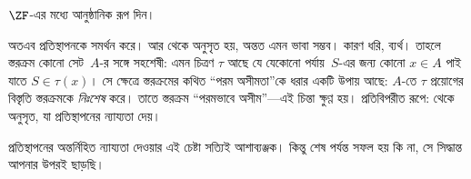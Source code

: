 \documentclass[../../../include/open-logic-section]{subfiles}
\begin{document}
\begin{prob}
	$\ZF$-এর মধ্যে \stagescofin{}
	আনুষ্ঠানিক রূপ দিন।
\end{prob}

অতএব \stagescofin{} প্রতিস্থাপনকে
সমর্থন করে। আর \stagesinex{} থেকে
\stagescofin{} অনুসৃত হয়, অন্তত
এমন ভাবা সম্ভব। কারণ ধরি,
\stagescofin{} ব্যর্থ। তাহলে স্তরক্রম
কোনো সেট~$A$-র সঙ্গে সহশেষী: এমন
চিত্রণ $\tau$ আছে যে যেকোনো
পর্যায়~$S$-এর জন্য কোনো $x \in A$
পাই যাতে $S \in \tau(x)$। সে ক্ষেত্রে
স্তরক্রমের কথিত ``পরম অসীমতা''কে
ধরার একটি উপায় আছে: $A$-তে
$\tau$ প্রয়োগের বিস্তৃতি স্তরক্রমকে
\emph{নিঃশেষ} করে। তাতে স্তরক্রম
``পরমভাবে অসীম''—এই চিন্তা ক্ষুণ্ণ হয়।
প্রতিবিপরীত রূপে: \stagesinex{} থেকে
\stagescofin{} অনুসৃত, যা প্রতিস্থাপনের
ন্যায্যতা দেয়।

প্রতিস্থাপনের অন্তর্নিহিত ন্যায্যতা
দেওয়ার এই চেষ্টা সত্যিই আশাব্যঞ্জক।
কিন্তু শেষ পর্যন্ত সফল হয় কি না,
সে সিদ্ধান্ত আপনার উপরই ছাড়ছি।
\end{document}
